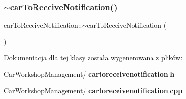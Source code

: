 \mbox{\label{classcar_to_receive_notification_ad7bf85e5d19a1e272e4b12e1be5d700f}} 
\subsubsection{$\sim$carToReceiveNotification()}
{\footnotesize\ttfamily car\+To\+Receive\+Notification\+::$\sim$car\+To\+Receive\+Notification (\begin{DoxyParamCaption}{ }\end{DoxyParamCaption})}



Dokumentacja dla tej klasy została wygenerowana z plików\+:\begin{DoxyCompactItemize}
\item 
Car\+Workshop\+Management/\textbf{ cartoreceivenotification.\+h}\item 
Car\+Workshop\+Management/\textbf{ cartoreceivenotification.\+cpp}\end{DoxyCompactItemize}

